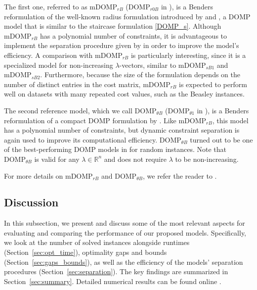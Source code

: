 \documentclass[letterpaper]{article}
\begin{document}
The first one, referred to as $\text{mDOMP}_{rB}$ ($\text{DOMP}_{r0B}$ in \citet{ljubic_benders_2024}), is a Benders reformulation of the well-known radius formulation introduced by \citet{puerto_new_2008} and \citet{marin_flexible_2009}, a DOMP model that is similar to the staircase formulation \eqref{DOMP_s}. Although $\text{mDOMP}_{rB}$ has a polynomial number of constraints, it is advantageous to implement the separation procedure given by \citet{ljubic_benders_2024} in order to improve the model's efficiency. A comparison with $\text{mDOMP}_{rB}$ is particularly interesting, since it is a specialized model for non-increasing $\lambda$-vectors, similar to $\text{mDOMP}_{sB1}$ and $\text{mDOMP}_{sB2}$. Furthermore, because the size of the formulation depends on the number of distinct entries in the cost matrix, $\text{mDOMP}_{rB}$ is expected to perform well on datasets with many repeated cost values, such as the Beasley instances.

The second reference model, which we call $\text{DOMP}_{\theta B}$ ($\text{DOMP}_{\theta 1}$ in \cite{ljubic_benders_2024}), is a Benders reformulation of a compact DOMP formulation by \citet{marin_fresh_2020}. Like $\text{mDOMP}_{rB}$, this model has a polynomial number of constraints, but dynamic constraint separation is again used to improve its computational efficiency. $\text{DOMP}_{\theta B}$ turned out to be one of the best-performing DOMP models in \citet{ljubic_benders_2024} for random instances. Note that $\text{DOMP}_{\theta B}$ is valid for any $\lambda \in \mathbb{R}^n$ and does not require $\lambda$ to be non-increasing.

For more details on $\text{mDOMP}_{rB}$ and $\text{DOMP}_{\theta B}$, we refer the reader to \citet{ljubic_benders_2024}.


\subsection{Discussion}\label{sec:discussion}
In this subsection, we present and discuss some of the most relevant aspects for evaluating and comparing the performance of our proposed models. Specifically, we look at the number of solved instances alongside runtimes (Section~\ref{sec:opt_time}), optimality gaps and bounds (Section~\ref{sec:gaps_bounds}), as well as the efficiency of the models' separation procedures (Section~\ref{sec:separation}). The key findings are summarized in Section~\ref{sec:summary}. Detailed numerical results can be found online \citep{instances2026dataset}.
\end{document}
